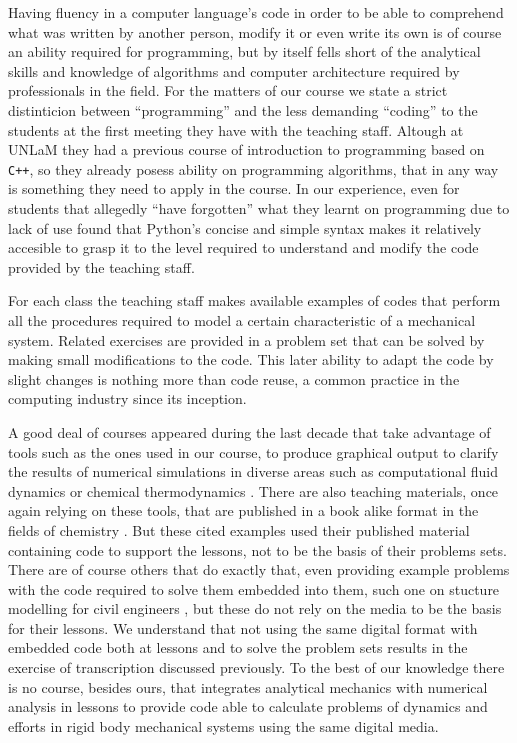 Having fluency in a computer language's code in order to be able to comprehend what was written by another person, modify it or even write its own is of course an ability required for programming, but by itself fells short of the analytical skills and knowledge of algorithms and computer architecture required by professionals in the field.
For the matters of our course we state a strict distinticion between ``programming'' and the less demanding ``coding'' to the students at the first meeting they have with the teaching staff.
Altough at UNLaM they had a previous course of introduction to programming based on \verb!C++!, so they already posess ability on programming algorithms, that in any way is something they need to apply in the course.
In our experience, even for students that allegedly ``have forgotten'' what they learnt on programming due to lack of use found that Python's concise and simple syntax \cite{perkel_programming_2015} makes it relatively accesible to grasp it to the level required to understand and modify the code provided by the teaching staff.

For each class the teaching staff makes available examples of codes that perform all the procedures required to model a certain characteristic of a mechanical system.
Related exercises are provided in a problem set that can be solved by making small modifications to the code.
This later ability to adapt the code by slight changes is nothing more than code reuse, a common practice in the computing industry since its inception.

A good deal of courses appeared during the last decade that take advantage of tools such as the ones used in our course, to produce graphical output to clarify the results of numerical simulations in diverse areas such as computational fluid dynamics \cite{barba_cfd_2018} or chemical thermodynamics \cite{vallejo_google_2022}.
There are also teaching materials, once again relying on these tools, that are published in a book alike format in the fields of chemistry \cite{weiss_creative_2021}.
But these cited examples used their published material containing code to support the lessons, not to be the basis of their problems sets.
There are of course others that do exactly that, even providing example problems with the code required to solve them embedded into them, such one on stucture modelling for civil engineers \cite{laureline_duvillard_using_nodate}, but these do not rely on the media to be the basis for their lessons.
We understand that not using the same digital format with embedded code both at lessons and to solve the problem sets results in the exercise of transcription discussed previously. 
To the best of our knowledge there is no course, besides ours, that integrates analytical mechanics with numerical analysis in lessons to provide code able to calculate problems of dynamics and efforts in rigid body mechanical systems using the same digital media.
